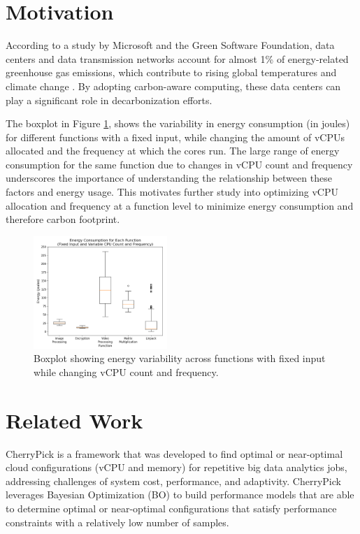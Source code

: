 \documentclass[times, 10pt,twocolumn]{article}
\begin{document}
\section{Motivation}

According to a study by Microsoft and the Green Software Foundation, data centers and data transmission networks account for almost 1\% of energy-related greenhouse gas emissions, which contribute to rising global temperatures and climate change \cite{carbon_aware_computing}. By adopting carbon-aware computing, these data centers can play a significant role in decarbonization efforts. 

The boxplot in Figure \ref{fig:energy_boxplot}, 
shows the variability in energy consumption (in joules) for different functions with a fixed input, while changing the amount of vCPUs allocated and the frequency at which the cores run. The large range of energy consumption for the same function due to changes in vCPU count and frequency underscores the importance of understanding the relationship between these factors and energy usage. This motivates further study into optimizing vCPU allocation and frequency at a function level to minimize energy consumption and therefore carbon footprint. 


\begin{figure}[ht]
   \centering
   \includegraphics[width=0.45\textwidth]{imgs/energy_boxplot.png}
   \caption{Boxplot showing energy variability across functions with fixed input while changing vCPU count and frequency. }
   \label{fig:energy_boxplot}
 \end{figure}
\section{Related Work}
CherryPick \cite{CherryPick} is a framework that was developed to find optimal or near-optimal cloud configurations (vCPU and memory) for repetitive big data analytics jobs, addressing challenges of system cost, performance, and adaptivity. CherryPick leverages Bayesian Optimization (BO) to build performance models that are able to determine optimal or near-optimal configurations that satisfy performance constraints with a relatively low number of samples. 
\end{document}
